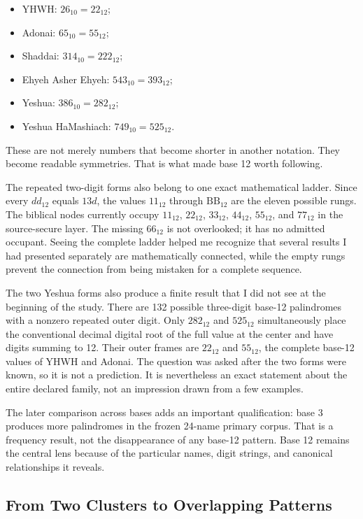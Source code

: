 \begin{itemize}
\item YHWH: $26_{10}=22_{12}$;
\item Adonai: $65_{10}=55_{12}$;
\item Shaddai: $314_{10}=222_{12}$;
\item Ehyeh Asher Ehyeh: $543_{10}=393_{12}$;
\item Yeshua: $386_{10}=282_{12}$;
\item Yeshua HaMashiach: $749_{10}=525_{12}$.
\end{itemize}

These are not merely numbers that become shorter in another notation. They become readable symmetries. That is what made base 12 worth following.

The repeated two-digit forms also belong to one exact mathematical ladder. Since every $dd_{12}$ equals $13d$, the values $11_{12}$ through $\mathrm{BB}_{12}$ are the eleven possible rungs. The biblical nodes currently occupy $11_{12}$, $22_{12}$, $33_{12}$, $44_{12}$, $55_{12}$, and $77_{12}$ in the source-secure layer. The missing $66_{12}$ is not overlooked; it has no admitted occupant. Seeing the complete ladder helped me recognize that several results I had presented separately are mathematically connected, while the empty rungs prevent the connection from being mistaken for a complete sequence.

The two Yeshua forms also produce a finite result that I did not see at the beginning of the study. There are 132 possible three-digit base-12 palindromes with a nonzero repeated outer digit. Only $282_{12}$ and $525_{12}$ simultaneously place the conventional decimal digital root of the full value at the center and have digits summing to 12. Their outer frames are $22_{12}$ and $55_{12}$, the complete base-12 values of YHWH and Adonai. The question was asked after the two forms were known, so it is not a prediction. It is nevertheless an exact statement about the entire declared family, not an impression drawn from a few examples.

The later comparison across bases adds an important qualification: base 3 produces more palindromes in the frozen 24-name primary corpus. That is a frequency result, not the disappearance of any base-12 pattern. Base 12 remains the central lens because of the particular names, digit strings, and canonical relationships it reveals.

\subsection{From Two Clusters to Overlapping Patterns}


